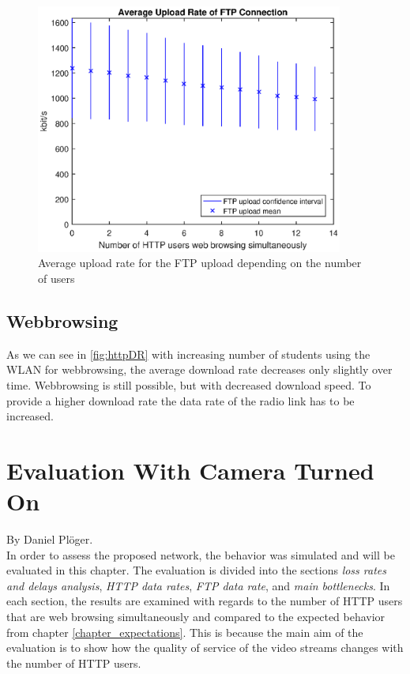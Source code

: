\documentclass[a4paper,10pt]{book}\usepackage{graphicx}
\begin{document}
\begin{figure}[!ht]
  \begin{center}
    \includegraphics[width=0.9\textwidth]{off_ftp_upload.eps}
    \caption{Average upload rate for the FTP upload depending on the number of users}
    \label{fig:ftpUpR}
  \end{center}
\end{figure}

\section{Webbrowsing}
As we can see in \ref{fig:httpDR} with increasing number of students using the WLAN for webbrowsing, the average download rate decreases only slightly over time. Webbrowsing is still possible, but with decreased download speed.
To provide a higher download rate the data rate of the radio link has to be increased. 

\chapter{Evaluation With Camera Turned On}
By Daniel Plöger.\\

In order to assess the proposed network, the behavior was simulated and will be evaluated in this chapter. The evaluation is divided into the sections \textit{loss rates and delays analysis}, \textit{HTTP data rates}, \textit{FTP data rate}, and \textit{main bottlenecks}. In each section, the results are examined with regards to the number of HTTP users that are web browsing simultaneously and compared to the expected behavior from chapter \ref{chapter_expectations}. This is because the main aim of the evaluation is to show how the quality of service of the video streams changes with the number of HTTP users. 
\end{document}

